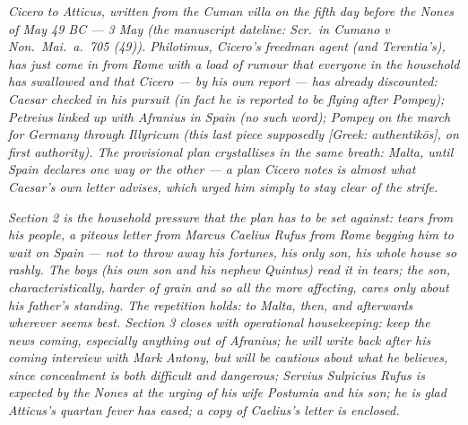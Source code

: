 
\textit{Cicero to Atticus, written from the Cuman villa
on the fifth day before the Nones of May 49 BC --- 3 May
(the manuscript dateline: \textit{Scr.\ in Cumano v Non.\
Mai.\ a.\ 705 (49)}). Philotimus, Cicero's freedman
agent (and Terentia's), has just come in from Rome with
a load of rumour that everyone in the household has
swallowed and that Cicero --- by his own report --- has
already discounted: Caesar checked in his pursuit (in
fact he is reported to be flying after Pompey); Petreius
linked up with Afranius in Spain (no such word); Pompey
on the march for Germany through Illyricum (this last
piece supposedly \textit{[Greek: authentik\=os]}, on
first authority). The provisional plan crystallises in
the same breath: Malta, until Spain declares one way or
the other --- a plan Cicero notes is almost what
Caesar's own letter advises, which urged him simply to
stay clear of the strife.}

\textit{Section 2 is the household pressure that the
plan has to be set against: tears from his people, a
piteous letter from Marcus Caelius Rufus from Rome
begging him to wait on Spain --- not to throw away his
fortunes, his only son, his whole house so rashly. The
boys (his own son and his nephew Quintus) read it in
tears; the son, characteristically, harder of grain
and so all the more affecting, cares only about his
father's standing. The repetition holds: to Malta, then,
and afterwards wherever seems best. Section 3 closes
with operational housekeeping: keep the news coming,
especially anything out of Afranius; he will write back
after his coming interview with Mark Antony, but will
be cautious about what he believes, since concealment
is both difficult and dangerous; Servius Sulpicius Rufus
is expected by the Nones at the urging of his wife
Postumia and his son; he is glad Atticus's quartan
fever has eased; a copy of Caelius's letter is enclosed.}
